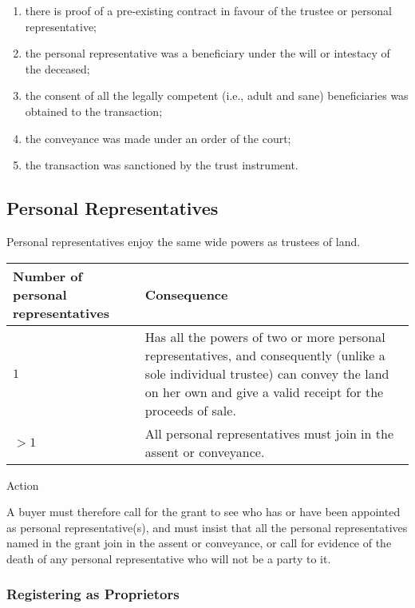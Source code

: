 \documentclass[
]{article}
\providecommand{\tightlist}{%
  \setlength{\itemsep}{0pt}\setlength{\parskip}{0pt}}
\newenvironment{env-a1c35d52-c355-4524-93c6-325e9133bd60}
{
    \savenotes\tcolorbox[blanker,breakable,left=5pt,borderline west={2pt}{-4pt}{aquamarine}]
}
{
    \endtcolorbox\spewnotes
}
\begin{document}
\begin{enumerate}
\tightlist
\item
  there is proof of a pre-existing contract in favour of the trustee or
  personal representative;
\item
  the personal representative was a beneficiary under the will or
  intestacy of the deceased;
\item
  the consent of all the legally competent (i.e., adult and sane)
  beneficiaries was obtained to the transaction;
\item
  the conveyance was made under an order of the court;
\item
  the transaction was sanctioned by the trust instrument.
\end{enumerate}

\hypertarget{personal-representatives}{%
\subsection{Personal Representatives}\label{personal-representatives}}

Personal representatives enjoy the same wide powers as trustees of land.

\begin{longtable}[]{@{}ll@{}}
\toprule()
Number of personal representatives & Consequence \\
\midrule()
\endhead
{\(1\)} & Has all the powers of two or more personal representatives,
and consequently (unlike a sole individual trustee) can convey the land
on her own and give a valid receipt for the proceeds of sale. \\
{\(> 1\)} & All personal representatives must join in the assent or
conveyance. \\
\bottomrule()
\end{longtable}

\begin{env-a1c35d52-c355-4524-93c6-325e9133bd60}

Action

A buyer must therefore call for the grant to see who has or have been
appointed as personal representative(s), and must insist that all the
personal representatives named in the grant join in the assent or
conveyance, or call for evidence of the death of any personal
representative who will not be a party to it.

\end{env-a1c35d52-c355-4524-93c6-325e9133bd60}

\hypertarget{registering-as-proprietors}{%
\subsubsection{Registering as
Proprietors}\label{registering-as-proprietors}}
\end{document}
